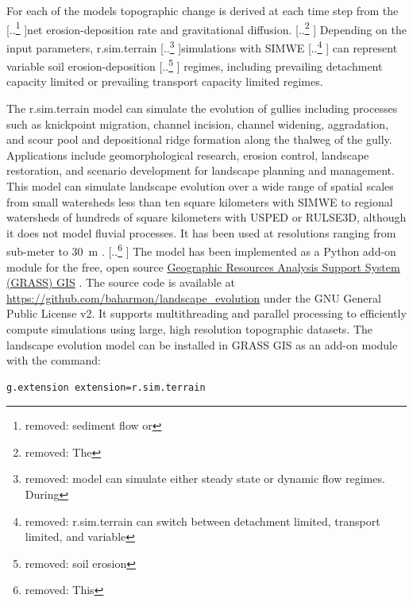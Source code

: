 \documentclass[gmd, manuscript]{copernicus}
\providecommand{\DIFadd}[1]{{\protect\color{blue} \sf #1}} %
\providecommand{\DIFdel}[1]{{\protect\color{red} [..\footnote{removed: #1} ]}} %
\providecommand{\DIFaddbegin}{} %
\providecommand{\DIFaddend}{} %
\providecommand{\DIFdelbegin}{} %
\providecommand{\DIFdelend}{} %
\begin{document}
For each of the models 
topographic change is derived at each time step
from the \DIFdelbegin \DIFdel{sediment flow or }\DIFdelend net erosion-deposition rate
and gravitational diffusion.
\DIFdelbegin \DIFdel{The }\DIFdelend \DIFaddbegin \DIFadd{Depending on the input parameters, 
}\DIFaddend r.sim.terrain \DIFdelbegin \DIFdel{model
can simulate either steady state or dynamic flow regimes.
During }\DIFdelend simulations with SIMWE 
\DIFdelbegin \DIFdel{r.sim.terrain
can switch between 
detachment limited, transport limited, and variable }\DIFdelend \DIFaddbegin \DIFadd{can represent variable soil }\DIFaddend erosion-deposition \DIFdelbegin \DIFdel{soil erosion }\DIFdelend \DIFaddbegin \DIFadd{regimes, 
including prevailing detachment capacity limited 
or prevailing transport capacity limited }\DIFaddend regimes.

The r.sim.terrain model
can simulate the evolution of gullies
including processes such as 
knickpoint migration,
channel incision, 
channel widening, 
aggradation, and
scour pool and 
depositional ridge formation
along the thalweg of the gully. 
Applications include 
geomorphological research,
erosion control, 
landscape restoration, 
and scenario development 
for landscape planning and management.
This model can simulate landscape evolution 
over a wide range of spatial scales 
from small watersheds 
less than ten square kilometers
with SIMWE
to regional watersheds
of hundreds of square kilometers
with USPED or RULSE3D,
although it does not model fluvial processes. 
\DIFaddbegin \DIFadd{It has been used at resolutions ranging from sub-meter to 30~}\unit{m}\DIFadd{.
}\DIFaddend %
\DIFdelbegin \DIFdel{This }\DIFdelend \DIFaddbegin \DIFadd{The }\DIFaddend model has been implemented 
as a Python add-on module 
for the free, open source
\href{https://grass.osgeo.org/}{Geographic Resources Analysis Support System (GRASS) GIS}
\citep{GRASS}. 
The source code is available at 
\url{https://github.com/baharmon/landscape\_evolution} 
under the GNU General Public License v2.
It supports multithreading and parallel processing
to efficiently compute simulations 
using large, high resolution topographic datasets.
%
The landscape evolution model 
can be installed in GRASS GIS as an add-on module 
with the command: 
\begin{verbatim}
g.extension extension=r.sim.terrain
\end{verbatim}

\end{document}
